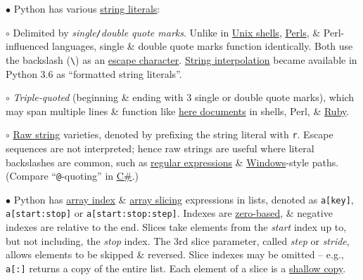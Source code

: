 \documentclass{article}
\numberwithin{equation}{section}
\begin{document}
\begin{enumerate*}
	\item[$\bullet$] Python has various \href{https://en.wikipedia.org/wiki/String_literal}{string literals}:
	\begin{enumerate*}
		\item[$\circ$] Delimited by \textit{single}\texttt{/}\textit{double quote marks}. Unlike in \href{https://en.wikipedia.org/wiki/Unix_shell}{Unix shells}, \href{https://en.wikipedia.org/wiki/Perl}{Perls}, \& Perl-influenced languages, single \& double quote marks function identically. Both use the backslash (\verb|\|) as an \href{https://en.wikipedia.org/wiki/Escape_character}{escape character}. \href{https://en.wikipedia.org/wiki/String_interpolation}{String interpolation} became available in Python 3.6 as ``formatted string literals''.
		\item[$\circ$] \textit{Triple-quoted} (beginning \& ending with 3 single or double quote marks), which may span multiple lines \& function like \href{https://en.wikipedia.org/wiki/Here_document}{here documents} in shells, Perl, \& \href{https://en.wikipedia.org/wiki/Ruby_(programming_language)}{Ruby}.
		\item[$\circ$] \href{https://en.wikipedia.org/wiki/Raw_string}{Raw string} varieties, denoted by prefixing the string literal with \texttt{r}. Escape sequences are not interpreted; hence raw strings are useful where literal backslashes are common, such as \href{https://en.wikipedia.org/wiki/Regular_expression}{regular expressions} \& \href{https://en.wikipedia.org/wiki/Microsoft_Windows}{Windows}-style paths. (Compare ``\verb|@|-quoting'' in \href{https://en.wikipedia.org/wiki/C_Sharp_(programming_language)}{C\#}.)
	\end{enumerate*}
	\item[$\bullet$] Python has \href{https://en.wikipedia.org/wiki/Array_index}{array index} \& \href{https://en.wikipedia.org/wiki/Array_slicing}{array slicing} expressions in lists, denoted as \texttt{a[key]}, \texttt{a[start:stop]} or \texttt{a[start:stop:step]}. Indexes are \href{https://en.wikipedia.org/wiki/Zero-based_numbering}{zero-based}, \& negative indexes are relative to the end. Slices take elements from the \textit{start} index up to, but not including, the \textit{stop} index. The 3rd slice parameter, called \textit{step} or \textit{stride}, allows elements to be skipped \& reversed. Slice indexes may be omitted -- e.g., \texttt{a[:]} returns a copy of the entire list. Each element of a slice is a \href{https://en.wikipedia.org/wiki/Shallow_copy}{shallow copy}.
\end{enumerate*}
\end{document}

